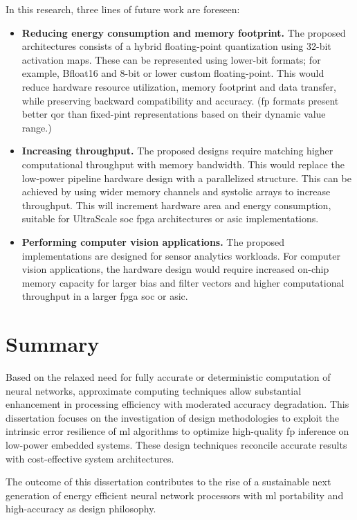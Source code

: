 In this research, three lines of future work are foreseen:
\begin{itemize}
	\item \textbf{Reducing energy consumption and memory footprint.} The proposed architectures consists of a hybrid floating-point quantization using 32-bit activation maps. These can be represented using lower-bit formats; for example, Bfloat16 and 8-bit or lower custom floating-point. This would reduce hardware resource utilization, memory footprint and data transfer, while preserving backward compatibility and accuracy. (\gls{fp} formats present better \gls{qor} than fixed-pint representations based on their dynamic value range.)
	
	\item \textbf{Increasing throughput.} The proposed designs require matching higher computational throughput with memory bandwidth. This would replace the low-power pipeline hardware design with a parallelized structure. This can be achieved by using wider memory channels and systolic arrays to increase throughput. This will increment hardware area and energy consumption, suitable for UltraScale \gls{soc} \gls{fpga} architectures or \gls{asic} implementations.
	
	\item \textbf{Performing computer vision applications.} The proposed implementations are designed for sensor analytics workloads. For computer vision applications, the hardware design would require increased on-chip memory capacity for larger bias and filter vectors and higher computational throughput in a larger \gls{fpga} \gls{soc} or \gls{asic}.
\end{itemize}

\section{Summary}

Based on the relaxed need for fully accurate or deterministic computation of neural networks, approximate computing techniques allow substantial enhancement in processing efficiency with moderated accuracy degradation. This dissertation focuses on the investigation of design methodologies to exploit the intrinsic error resilience of \gls{ml} algorithms to optimize high-quality \gls{fp} inference on low-power embedded systems. These design techniques reconcile accurate results with cost-effective system architectures.

The outcome of this dissertation contributes to the rise of a sustainable next generation of energy efficient neural network processors with \gls{ml} portability and high-accuracy as design philosophy.

